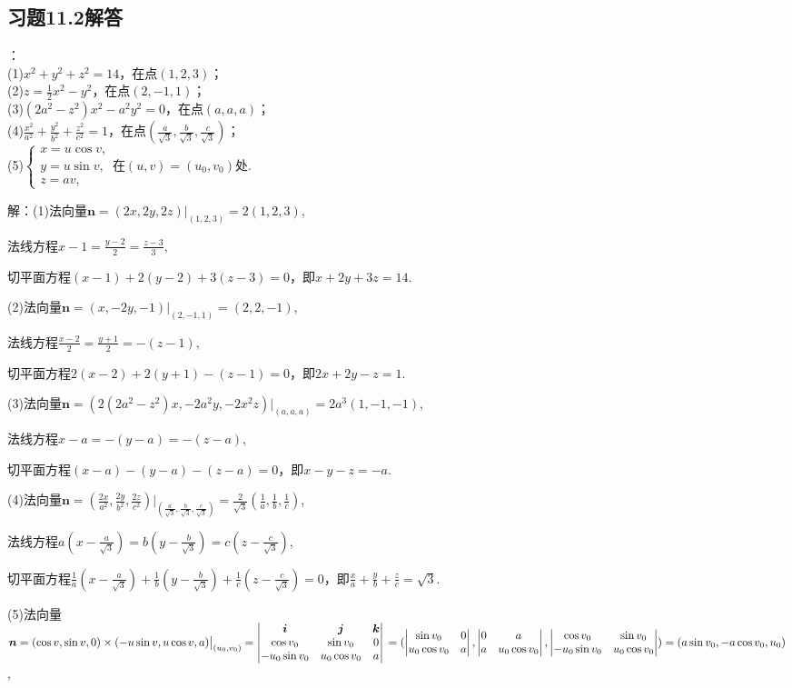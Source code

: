 \documentclass[12pt,UTF8]{ctexart}
\begin{document}
\subsection{习题11.2解答}
\begin{enumerate}
：\\
(1)$x^2+y^2+z^2=14$，在点$(1,2,3)$；\\
(2)$z=\frac12x^2-y^2$，在点$(2,-1,1)$；\\
(3)$(2a^2-z^2)x^2-a^2y^2=0$，在点$(a,a,a)$；\\
(4)$\frac{x^2}{a^2}+\frac{y^2}{b^2}+\frac{z^2}{c^2}=1$，在点$(\frac a{\sqrt3},\frac b{\sqrt3},\frac c{\sqrt3})$；\\
(5)$\begin{cases}
x=u\cos v,\\
y=u\sin v,\\
z=av,
\end{cases}$在$(u,v)=(u_0,v_0)$处.

解：(1)法向量$\bm n=(2x,2y,2z)\big|_{(1,2,3)}=2(1,2,3)$,

法线方程$x-1=\frac{y-2}2=\frac{z-3}3$,

切平面方程$(x-1)+2(y-2)+3(z-3)=0$，即$x+2y+3z=14$.

(2)法向量$\bm n=(x,-2y,-1)\big|_{(2,-1,1)}=(2,2,-1)$,

法线方程$\frac{x-2}2=\frac{y+1}2=-(z-1)$,

切平面方程$2(x-2)+2(y+1)-(z-1)=0$，即$2x+2y-z=1$.

(3)法向量$\bm n=(2(2a^2-z^2)x,-2a^2y,-2x^2z)\big|_{(a,a,a)}=2a^3(1,-1,-1)$,

法线方程$x-a=-(y-a)=-(z-a)$,

切平面方程$(x-a)-(y-a)-(z-a)=0$，即$x-y-z=-a$.

(4)法向量$\bm n=(\frac{2x}{a^2},\frac{2y}{b^2},\frac{2z}{c^2})\big|_{(\frac a{\sqrt3},\frac b{\sqrt3},\frac c{\sqrt3})}=\frac2{\sqrt3}(\frac1a,\frac1b,\frac1c)$,

法线方程$a(x-\frac a{\sqrt3})=b(y-\frac b{\sqrt3})=c(z-\frac c{\sqrt3})$,

切平面方程$\frac1a(x-\frac a{\sqrt3})+\frac1b(y-\frac b{\sqrt3})+\frac1c(z-\frac c{\sqrt3})=0$，即$\frac xa+\frac yb+\frac zc=\sqrt3$.

(5)法向量$\bm n=(\cos v,\sin v,0)\times(-u\sin v,u\cos v,a)\big|_{(u_0,v_0)}=\begin{vmatrix}
\bm i&\bm j&\bm k\\
\cos v_0&\sin v_0&0\\
-u_0\sin v_0&u_0\cos v_0&a
\end{vmatrix}\\
=(\begin{vmatrix}
\sin v_0&0\\
u_0\cos v_0&a
\end{vmatrix},\begin{vmatrix}
0&a\\
a&u_0\cos v_0
\end{vmatrix},\begin{vmatrix}
\cos v_0&\sin v_0\\
-u_0\sin v_0&u_0\cos v_0
\end{vmatrix})=(a\sin v_0,-a\cos v_0,u_0)$,


\end{enumerate}
\end{document}
